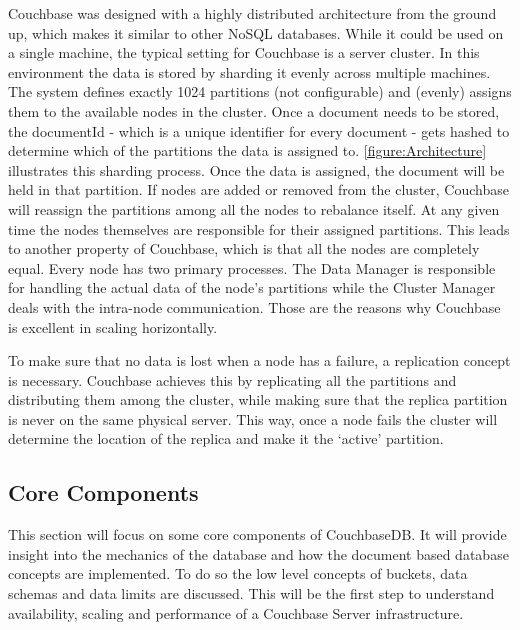 Couchbase was designed with a highly distributed architecture from the ground up, which makes it similar to other NoSQL databases. While it could be used on a single machine, the typical setting for Couchbase is a server cluster.
In this environment the data is stored by sharding it evenly across multiple machines. The system defines exactly 1024 partitions (not configurable) and (evenly) assigns them to the available nodes in the cluster. Once a document needs to be stored, the documentId - which is a unique identifier for every document - gets hashed to determine which of the partitions the data is assigned to. \autoref{figure:Architecture} illustrates this sharding process. Once the data is assigned, the document will be held in that partition. If nodes are added or removed from the cluster, Couchbase will reassign the partitions among all the nodes to rebalance itself. At any given time the nodes themselves are responsible for their assigned partitions. This leads to another property of Couchbase, which is that all the nodes are completely equal. Every node has two primary processes. The Data Manager is responsible for handling the actual data of the node's partitions while the Cluster Manager deals with the intra-node communication. Those are the reasons why Couchbase is excellent in scaling horizontally. \parencite{objelean}

To make sure that no data is lost when a node has a failure, a replication concept is necessary. Couchbase achieves this by replicating all the partitions and distributing them among the cluster, while making sure that the replica partition is never on the same physical server. This way, once a node fails the cluster will determine the location of the replica and make it the ‘active’ partition.

\subsection{Core Components}
\label{section:corecomponents}
This section will focus on some core components of CouchbaseDB. It will provide insight into the mechanics of the database and how the document based database concepts are implemented. To do so the low level concepts of buckets, data schemas and data limits are discussed. This will be the first step to understand availability, scaling and performance of a Couchbase Server infrastructure.
